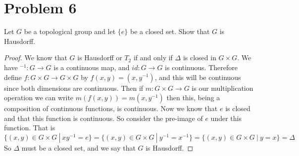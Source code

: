 \documentclass{article}
\theoremstyle{definition}
\begin{document}
\section*{Problem 6}
    \begin{mdframed}[]
        Let $G$ be a topological group and let $\{e\}$ be a closed set. Show that $G$ is Hausdorff.
    \end{mdframed}
    \begin{proof}
        We know that $G$ is Hausdorff or $T_2$ if and only if $\Delta$ is closed in $G \times G$.
        We have $^{-1}:G \rightarrow G$ is a continuous map, and $id:G\rightarrow G$ is continuous.
        Therefore define $f: G \times G \rightarrow G\times G$ by $f(x,y) = (x, y^{-1})$, and this will be continuous 
        since both dimensions are continuous. Then if $m:G \times G \rightarrow G$ is our multiplication operation
        we can write $m(f(x,y)) = m(x, y^{-1})$ then this, being a composition of continuous functions, is continuous.
        Now we know that ${e}$ is closed and that this function is continuous. So consider the pre-image of ${e}$ under this function.
        That is \[
            \{(x,y) \in G \times G \ | \ xy^{-1} = e\} = \{ (x,y) \in G \times G \ | \ y^{-1} = x^{-1}\} = \{(x,y) \in G \times G \ | \ y = x \} = \Delta
        \]
        So $\Delta$ must be a closed set, and we say that $G$ is Hausdorff.
    \end{proof}
\end{document}
